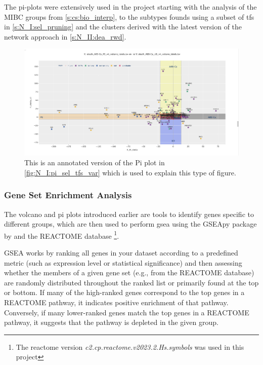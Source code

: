 The pi-plots were extensively used in the project starting with the analysis of the MIBC groups from \cref{s:cs:bio_interp}, to the subtypes founds using a subset of \acrlong{tf}s in \cref{s:N_I:sel_pruning} and the clusters derived with the latest version of the network approach in \cref{s:N_II:dea_rwd}.

\begin{figure}[!htb]    
    \centering
    \includegraphics[width=1.0\textwidth,height=1.0\textheight,keepaspectratio]{Sections/Network_I/Resources/selective_pruning/sel_tfs_pi_all_var_rect.png}
    \caption{This is an annotated version of the Pi plot in \cref{fig:N_I:pi_sel_tfs_var} which is used to explain this type of figure.}
    \label{fig:lit:pi_eg}
\end{figure}

\subsubsection{Gene Set Enrichment Analysis} \label{s:lit:gsea}

The volcano and pi plots introduced earlier are tools to identify genes specific to different groups, which are then used to perform \acrfull{gsea} using the GSEApy package by \citep{Fang2023-ec} and the REACTOME database \cite{Milacic2024-yt} \footnote{The reactome version \textit{c2.cp.reactome.v2023.2.Hs.symbols }was used in this project}.

GSEA works by ranking all genes in your dataset according to a predefined metric (such as expression level or statistical significance) and then assessing whether the members of a given gene set (e.g., from the REACTOME database) are randomly distributed throughout the ranked list or primarily found at the top or bottom. If many of the high-ranked genes correspond to the top genes in a REACTOME pathway, it indicates positive enrichment of that pathway. Conversely, if many lower-ranked genes match the top genes in a REACTOME pathway, it suggests that the pathway is depleted in the given group.

